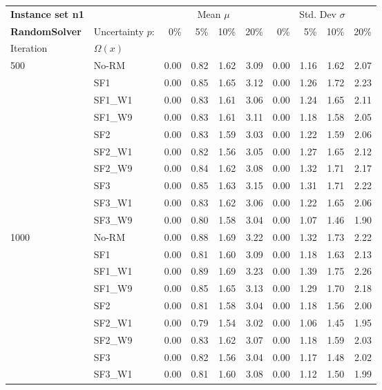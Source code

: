 {\fontsize{9.5}{10.5} \selectfont
\begin{longtable}{ll|rrrr|rrrr}
\toprule
\textbf{Instance set n1}                 & {} & \multicolumn{4}{c|}{Mean $\mu$} & \multicolumn{4}{c}{Std. Dev $\sigma$} \\
\textbf{RandomSolver}                 & Uncertainty $p$: & 0\% & 5\% & 10\% & 20\% & 0\% & 5\% & 10\% & 20\% \\
Iteration & $\Omega(x)$ &      &      &      &      &      &      &      &      \\
\midrule
500  & No-RM & 0.00 & 0.82 & 1.62 & 3.09 & 0.00 & 1.16 & 1.62 & 2.07 \\
     & SF1 & 0.00 & 0.85 & 1.65 & 3.12 & 0.00 & 1.26 & 1.72 & 2.23 \\
     & SF1\_W1 & 0.00 & 0.83 & 1.61 & 3.06 & 0.00 & 1.24 & 1.65 & 2.11 \\
     & SF1\_W9 & 0.00 & 0.83 & 1.61 & 3.11 & 0.00 & 1.18 & 1.58 & 2.05 \\
     & SF2 & 0.00 & 0.83 & 1.59 & 3.03 & 0.00 & 1.22 & 1.59 & 2.06 \\
     & SF2\_W1 & 0.00 & 0.82 & 1.56 & 3.05 & 0.00 & 1.27 & 1.65 & 2.12 \\
     & SF2\_W9 & 0.00 & 0.84 & 1.62 & 3.08 & 0.00 & 1.32 & 1.71 & 2.17 \\
     & SF3 & 0.00 & 0.85 & 1.63 & 3.15 & 0.00 & 1.31 & 1.71 & 2.22 \\
     & SF3\_W1 & 0.00 & 0.83 & 1.62 & 3.06 & 0.00 & 1.22 & 1.65 & 2.06 \\
     & SF3\_W9 & 0.00 & 0.80 & 1.58 & 3.04 & 0.00 & 1.07 & 1.46 & 1.90 \\ \hline
1000 & No-RM & 0.00 & 0.88 & 1.69 & 3.22 & 0.00 & 1.32 & 1.73 & 2.22 \\
     & SF1 & 0.00 & 0.81 & 1.60 & 3.09 & 0.00 & 1.18 & 1.63 & 2.13 \\
     & SF1\_W1 & 0.00 & 0.89 & 1.69 & 3.23 & 0.00 & 1.39 & 1.75 & 2.26 \\
     & SF1\_W9 & 0.00 & 0.85 & 1.65 & 3.13 & 0.00 & 1.29 & 1.70 & 2.18 \\
     & SF2 & 0.00 & 0.81 & 1.58 & 3.04 & 0.00 & 1.18 & 1.56 & 2.00 \\
     & SF2\_W1 & 0.00 & 0.79 & 1.54 & 3.02 & 0.00 & 1.06 & 1.45 & 1.95 \\
     & SF2\_W9 & 0.00 & 0.83 & 1.62 & 3.07 & 0.00 & 1.18 & 1.59 & 2.03 \\
     & SF3 & 0.00 & 0.82 & 1.56 & 3.04 & 0.00 & 1.17 & 1.48 & 2.02 \\
     & SF3\_W1 & 0.00 & 0.81 & 1.60 & 3.08 & 0.00 & 1.12 & 1.50 & 1.99 \\

\end{longtable}}
